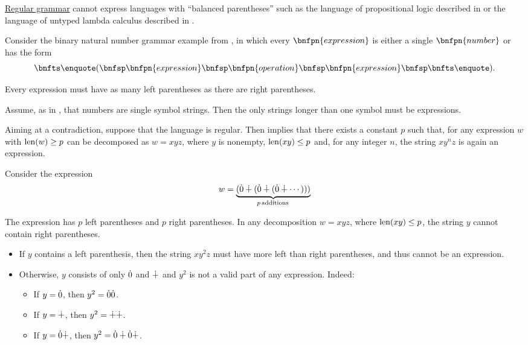 \begin{example}
\begin{thmenum}
     \hyperref[def:chomsky_hierarchy/regular]{Regular grammar} cannot express languages with \enquote{balanced parentheses} such as the language of propositional logic described in  or the language of untyped lambda calculus described in .

    Consider the binary natural number grammar example from , in which every \( \bnfpn{expression} \) is either a single \( \bnfpn{number} \) or has the form
    \begin{equation*}
      \bnftsq{(} \bnfsp \bnfpn{expression} \bnfsp \bnfpn{operation} \bnfsp \bnfpn{expression} \bnfsp \bnftsq{)}.
    \end{equation*}

    Every expression must have as many left parentheses as there are right parentheses.

    Assume, as in , that numbers are single symbol strings. Then the only strings longer than one symbol must be expressions.

    Aiming at a contradiction, suppose that the language is regular. Then  implies that there exists a constant \( p \) such that, for any expression \( w \) with \( \operatorname{len}(w) \geq p \) can be decomposed as \( w = x y z \), where \( y \) is nonempty, \( \operatorname{len}(xy) \leq p \) and, for any  integer \( n \), the string \( x y^n z \) is again an expression.

    Consider the expression
    \begin{equation*}
      w = \underbrace{(\syn0 \synplus (\syn0 \synplus (\syn0 \synplus \cdots)))}_{p \T*{additions}}
    \end{equation*}

    The expression has \( p \) left parentheses and \( p \) right parentheses. In any decomposition \( w = xyz \), where \( \operatorname{len}(xy) \leq p \), the string \( y \) cannot contain right parentheses.
    \begin{itemize}
      \item If \( y \) contains a left parenthesis, then the string \( x y^2 z \) must have more left than right parentheses, and thus cannot be an expression.

      \item Otherwise, \( y \) consists of only \( \dot{0} \) and \( \mathbin{\dotplus} \) and \( y^2 \) is not a valid part of any expression. Indeed:
      \begin{itemize}
        \item If \( y = \dot{0} \), then \( y^2 = \dot{0} \dot{0} \).

        \item If \( y = \mathbin{\dotplus} \), then \( y^2 = \mathbin{\dotplus} \mathbin{\dotplus} \).

        \item If \( y = \dot{0} \mathbin{\dotplus} \), then \( y^2 = \dot{0} \mathbin{\dotplus} \dot{0} \mathbin{\dotplus} \).
      \end{itemize}
    \end{itemize}
  \end{thmenum}
\end{example}
